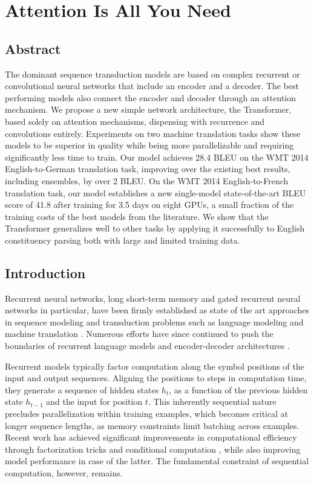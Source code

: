 
\chapter{Attention Is All You Need}

\section{Abstract}

The dominant sequence transduction models are based on complex recurrent or
convolutional neural networks that include an encoder and a decoder. The best
performing models also connect the encoder and decoder through an attention
mechanism. We propose a new simple network architecture, the Transformer,
based solely on attention mechanisms, dispensing with recurrence and
convolutions entirely. Experiments on two machine translation tasks show these
models to be superior in quality while being more parallelizable and requiring
significantly less time to train. Our model achieves 28.4 BLEU on the WMT
2014 English-to-German translation task, improving over the existing best
results, including ensembles, by over 2 BLEU. On the WMT 2014
English-to-French translation task, our model establishes a new single-model
state-of-the-art BLEU score of 41.8 after training for 3.5 days on eight
GPUs, a small fraction of the training costs of the best models from the
literature. We show that the Transformer generalizes well to other tasks by
applying it successfully to English constituency parsing both with large and
limited training data.

\section{Introduction}

Recurrent neural networks, long short-term memory \cite{hochreiter1997long}
and gated recurrent \cite{cho2014learning} neural networks in particular, have
been firmly established as state of the art approaches in sequence modeling
and transduction problems such as language modeling and machine translation
\cite{sutskever2014sequence,cho2014learning,bahdanau2014neural}. Numerous
efforts have since continued to push the boundaries of recurrent language
models and encoder-decoder architectures
\cite{wu2016google,luong2015effective,jozefowicz2016exploring}.

Recurrent models typically factor computation along the symbol positions of
the input and output sequences. Aligning the positions to steps in computation
time, they generate a sequence of hidden states $h_t$, as a function of the
previous hidden state $h_{t-1}$ and the input for position $t$. This inherently
sequential nature precludes parallelization within training examples, which
becomes critical at longer sequence lengths, as memory constraints limit
batching across examples. Recent work has achieved significant improvements in
computational efficiency through factorization tricks
\cite{kuchaiev2017factorization} and conditional computation
\cite{shazeer2017outrageously}, while also improving model performance in case
of the latter. The fundamental constraint of sequential computation, however,
remains.

